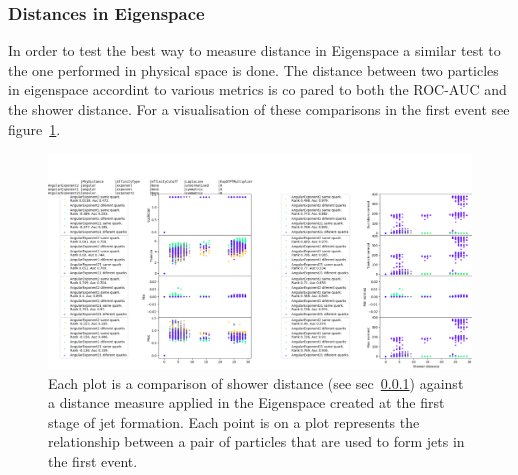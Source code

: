 \subsubsection{Distances in Eigenspace}\label{sec:distance_in_eigenspace}
In order to test the best way to measure distance in Eigenspace a similar test to the one performed in physical space is done.
The distance between two particles in eigenspace accordint to various metrics is co pared to both the ROC-AUC
and the shower distance.
For a visualisation of these comparisons in the first event see figure~\ref{fig:eigenspace_distance_example}.
\begin{figure}[htp]
    \includegraphics[width=1.\textwidth]{graphics/eigenspace_distance_example}
    \caption{
        Each plot is a comparison of shower distance (see sec~\ref{sec:distance_in_eigenspace})
        against a distance measure applied in the Eigenspace created at the first stage of
        jet formation.
        Each point is on a plot represents the relationship between a pair of particles
        that are used to form jets in the first event.
             }\label{fig:eigenspace_distance_example}
\end{figure}    

